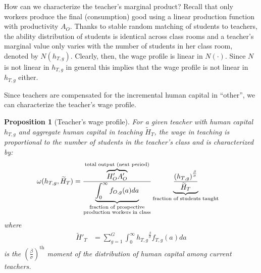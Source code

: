 \documentclass[onehalfspacing,11pt]{article}
\newtheorem{prp}{Proposition}
\begin{document}
How can we characterize the teacher's marginal product? Recall that only workers produce the final (consumption) good using a linear production function with productivity $A_O$. Thanks to stable random matching of students to teachers, the ability distribution of students is identical across class rooms and a teacher's marginal value only varies with the number of students in her class room, denoted by $N(h_{T,g})$. Clearly, then, the wage profile is linear in $N(\cdot)$. Since $N$ is not linear in $h_{T,g}$ in general this implies that the wage profile is not linear in $h_{T,g}$ either.

Since teachers are compensated for the incremental human capital in ``other'', we can characterize the teacher's wage profile.
\begin{prp}[Teacher's wage profile] For a given teacher with human capital $h_{T,g}$ and aggregate human capital in teaching $\widetilde{H}_T$, the wage in teaching is proportional to the \textit{number of students} in the teacher's class and is characterized by:
\begin{align}
\label{eq:omegaOpt}
   \omega(h_{T,g},\widetilde{H}_T) & =  \frac{\overbrace{{H}'_O {A}'_O}^{\textrm{total output (next period)}}}{\underbrace{\int_0^\infty f_{O,g}(a) da}_{\begin{subarray}{c}\textrm{fraction of prospective} \\ \textrm{production workers in class}\end{subarray}}} \underbrace{\frac{\left( h_{T,g} \right)^{\frac{\beta}{\sigma}}}{{\widetilde{H}_T}}}_{\textrm{fraction of students taught}}
\end{align}
where
\begin{align*}
\label{}
  \widetilde{H}'_{T} & = \sum_{g=1}^G\int_0^\infty {h_{T,g}}^{\frac{\beta}{\sigma}} f_{T,g}(a) da
\end{align*}
is the ${\left( \tfrac{\beta}{\sigma} \right)}^{\textrm{th}}$ moment of the distribution of human capital among current teachers.
\end{prp}
\end{document}

